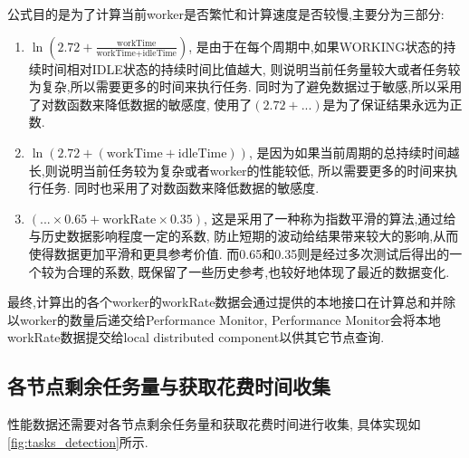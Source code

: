 \documentclass{mproj}
\begin{document}
公式目的是为了计算当前worker是否繁忙和计算速度是否较慢,主要分为三部分:
\begin{enumerate}
    \item $\ln\left( 2.72 + \frac{\text{workTime}}{\text{workTime} + \text{idleTime}} \right)$,
          是由于在每个周期中,如果WORKING状态的持续时间相对IDLE状态的持续时间比值越大,
          则说明当前任务量较大或者任务较为复杂,所以需要更多的时间来执行任务.
          同时为了避免数据过于敏感,所以采用了对数函数来降低数据的敏感度,
          使用了$(2.72+...)$是为了保证结果永远为正数.

    \item $\ln\left( 2.72 + (\text{workTime} + \text{idleTime}) \right)$,
          是因为如果当前周期的总持续时间越长,则说明当前任务较为复杂或者worker的性能较低,
          所以需要更多的时间来执行任务.
          同时也采用了对数函数来降低数据的敏感度.

    \item $(... \times 0.65 +\text{workRate} \times 0.35)$,
          这是采用了一种称为指数平滑\cite{GARDNER2006637}的算法,通过给与历史数据影响程度一定的系数,
          防止短期的波动给结果带来较大的影响,从而使得数据更加平滑和更具参考价值.
          而0.65和0.35则是经过多次测试后得出的一个较为合理的系数,
          既保留了一些历史参考,也较好地体现了最近的数据变化.
\end{enumerate}

最终,计算出的各个worker的workRate数据会通过提供的本地接口在计算总和并除以worker的数量后递交给Performance Monitor,
Performance Monitor会将本地workRate数据提交给local distributed component以供其它节点查询.


\subsection{各节点剩余任务量与获取花费时间收集}

性能数据还需要对各节点剩余任务量和获取花费时间进行收集,
具体实现如\cref{fig:tasks_detection}所示.
\end{document}
